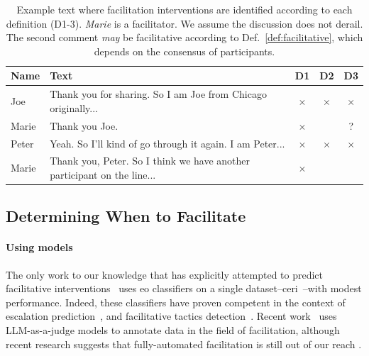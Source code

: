 \documentclass[11pt]{article}
\theoremstyle{definition}
\theoremstyle{plain}
\begin{document}
\begin{table}[t]
	\centering
	\small
	\begin{tabularx}{\linewidth}{l X c c c}
		\toprule
		\textbf{Name} & \textbf{Text} & \textbf{D1} & \textbf{D2} & \textbf{D3} \\
		\midrule
		Joe & Thank you for sharing. So I am Joe from Chicago originally... & $\times$ & $\times$ & $\times$ \\
		Marie & Thank you Joe. & $\times$ & \checkmark & ? \\
		Peter & Yeah. So I'll kind of go through it again. I am Peter... & $\times$ & $\times$ & $\times$ \\
		Marie & Thank you, Peter. So I think we have another participant on the line... & $\times$ & \checkmark & \checkmark \\
		\bottomrule
	\end{tabularx}
	\caption{Example text where facilitation interventions are identified according to each definition (D1-3). \textit{Marie} is a facilitator. We assume the discussion does not derail. The second comment \textit{may} be facilitative according to Def.~\ref{def:facilitative}, which depends on the consensus of participants.}
	\label{tab:definitions-example}
\end{table}


\subsection{Determining When to Facilitate}
\label{sec:how_to_determine}

\paragraph{Using models}
The only work to our knowledge that has explicitly attempted to predict facilitative interventions~\citep{falk-etal-2021-predicting} uses \ac{eo} classifiers on a single dataset--\acs{ceri}~\citep{ceri}--with modest performance. Indeed, these classifiers have proven competent in the context of escalation prediction~\cite{cmv_awry2,Yuan_Singh_2023}, and facilitative tactics detection~\citep{chen-etal-2025-whow, schroeder-etal-2024-fora}. Recent work~\cite{schroeder-etal-2024-fora, chen-etal-2025-whow} uses LLM-as-a-judge models to annotate data in the field of facilitation, although recent research suggests that fully-automated facilitation is still out of our reach \cite{korre-etal-2025-evaluation}.
\end{document}
